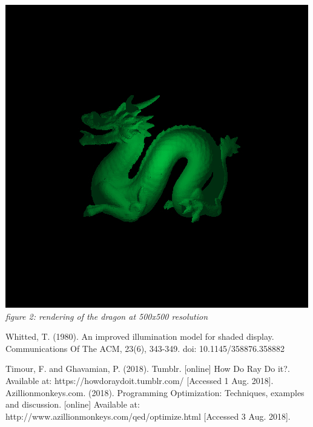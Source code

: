 \documentclass[letterpaper, 10 pt, conference]{ieeeconf}  %
\begin{document}

\includegraphics[width=.95\columnwidth]{dragon.jpg} 
{\small\textit{figure 2: rendering of the dragon at 500x500 resolution}}

\begin{thebibliography}{99}

 Whitted, T. (1980). An improved illumination model for shaded display. Communications Of The ACM, 23(6), 343-349. doi: 10.1145/358876.358882

 Timour, F. and Ghavamian, P. (2018). Tumblr. [online] How Do Ray Do it?. Available at: https://howdoraydoit.tumblr.com/ [Accessed 1 Aug. 2018].
Azillionmonkeys.com. (2018). Programming Optimization: Techniques, examples and discussion. [online] Available at: http://www.azillionmonkeys.com/qed/optimize.html [Accessed 3 Aug. 2018].




\end{thebibliography}
\end{document}
